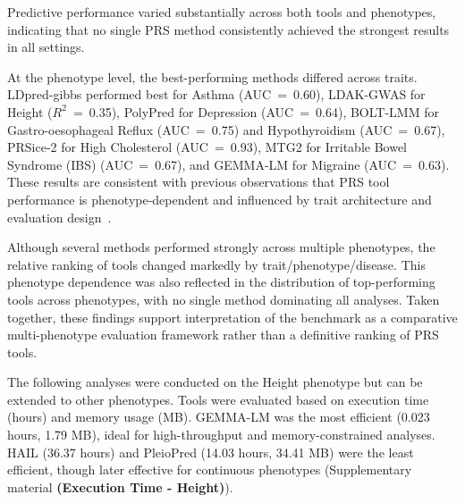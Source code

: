 \documentclass[pdflatex,sn-basic]{sn-jnl}
\begin{document}
Predictive performance varied substantially across both tools and phenotypes, indicating that no single PRS method consistently achieved the strongest results in all settings.

At the phenotype level, the best-performing methods differed across traits. LDpred-gibbs performed best for Asthma (AUC~=~0.60), LDAK-GWAS for Height ($R^2$~=~0.35), PolyPred for Depression (AUC~=~0.64), BOLT-LMM for Gastro-oesophageal Reflux (AUC~=~0.75) and Hypothyroidism (AUC~=~0.67), PRSice-2 for High Cholesterol (AUC~=~0.93), MTG2 for Irritable Bowel Syndrome (IBS) (AUC~=~0.67), and GEMMA-LM for Migraine (AUC~=~0.63). These results are consistent with previous observations that PRS tool performance is phenotype-dependent and influenced by trait architecture and evaluation design~\cite{Ma2021}.

Although several methods performed strongly across multiple phenotypes, the relative ranking of tools changed markedly by trait/phenotype/disease. This phenotype dependence was also reflected in the distribution of top-performing tools across phenotypes, with no single method dominating all analyses. Taken together, these findings support interpretation of the benchmark as a comparative multi-phenotype evaluation framework rather than a definitive ranking of PRS tools.  


 

The following analyses were conducted on the Height phenotype but can be extended to other phenotypes. Tools were evaluated based on execution time (hours) and memory usage (MB). GEMMA-LM was the most efficient (0.023 hours, 1.79 MB), ideal for high-throughput and memory-constrained analyses. HAIL (36.37 hours) and PleioPred (14.03 hours, 34.41 MB) were the least efficient, though later effective for continuous phenotypes (Supplementary material \textbf{(Execution Time - Height)}). 
\end{document}
